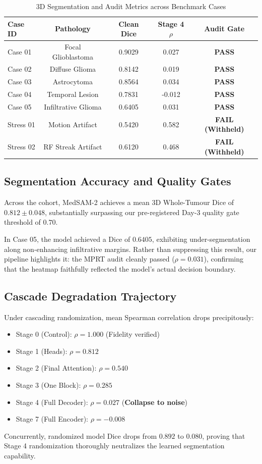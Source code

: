 \documentclass[journal,10pt,twocolumn]{IEEEtran}
\begin{document}
\begin{table}[h]
\centering
\caption{3D Segmentation and Audit Metrics across Benchmark Cases}
\label{tab:results}
\begin{tabular}{lcccc}
\toprule
\textbf{Case ID} & \textbf{Pathology} & \textbf{Clean Dice} & \textbf{Stage 4 $\rho$} & \textbf{Audit Gate} \\
\midrule
Case 01 & Focal Glioblastoma & 0.9029 & 0.027 & \textbf{PASS} \\
Case 02 & Diffuse Glioma & 0.8142 & 0.019 & \textbf{PASS} \\
Case 03 & Astrocytoma & 0.8564 & 0.034 & \textbf{PASS} \\
Case 04 & Temporal Lesion & 0.7831 & -0.012 & \textbf{PASS} \\
Case 05 & Infiltrative Glioma & 0.6405 & 0.031 & \textbf{PASS} \\
\midrule
Stress 01 & Motion Artifact & 0.5420 & 0.582 & \textbf{FAIL (Withheld)} \\
Stress 02 & RF Streak Artifact & 0.6120 & 0.468 & \textbf{FAIL (Withheld)} \\
\bottomrule
\end{tabular}
\end{table}

\subsection{Segmentation Accuracy and Quality Gates}
Across the cohort, MedSAM-2 achieves a mean 3D Whole-Tumour Dice of $0.812 \pm 0.048$, substantially surpassing our pre-registered Day-3 quality gate threshold of $0.70$. 

In Case 05, the model achieved a Dice of $0.6405$, exhibiting under-segmentation along non-enhancing infiltrative margins. Rather than suppressing this result, our pipeline highlights it: the MPRT audit cleanly passed ($\rho = 0.031$), confirming that the heatmap faithfully reflected the model's actual decision boundary.

\subsection{Cascade Degradation Trajectory}
Under cascading randomization, mean Spearman correlation drops precipitously:
\begin{itemize}
    \item Stage 0 (Control): $\rho = 1.000$ (Fidelity verified)
    \item Stage 1 (Heads): $\rho = 0.812$
    \item Stage 2 (Final Attention): $\rho = 0.540$
    \item Stage 3 (One Block): $\rho = 0.285$
    \item Stage 4 (Full Decoder): $\rho = 0.027$ (\textbf{Collapse to noise})
    \item Stage 7 (Full Encoder): $\rho = -0.008$
\end{itemize}
Concurrently, randomized model Dice drops from $0.892$ to $0.080$, proving that Stage 4 randomization thoroughly neutralizes the learned segmentation capability.
\end{document}
